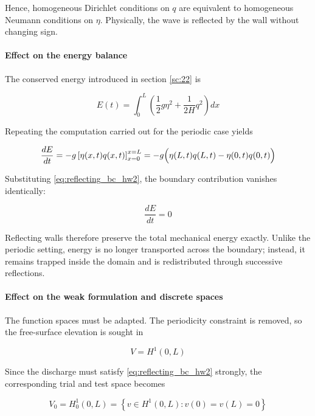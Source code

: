 Hence, homogeneous Dirichlet conditions on \(q\) are equivalent to homogeneous Neumann conditions on \(\eta\). Physically, the wave is reflected by the wall without changing sign.

\paragraph{Effect on the energy balance}
The conserved energy introduced in section \ref{sc:22} is

\begin{equation}
E(t) = \int_0^L \left(\frac{1}{2}g\eta^2 + \frac{1}{2H}q^2\right) dx
\label{eq:energy_rw}
\end{equation}

Repeating the computation carried out for the periodic case yields

\begin{equation}
\frac{dE}{dt}
= -g\left[\eta(x,t) q(x,t)\right]_{x=0}^{x=L}
= -g\Bigl(\eta(L,t)q(L,t)-\eta(0,t)q(0,t)\Bigr)
\label{eq:energy_wall_boundary_term}
\end{equation}

Substituting \eqref{eq:reflecting_bc_hw2}, the boundary contribution vanishes identically:

\begin{equation}
\frac{dE}{dt}=0
\label{eq:energy_reflecting_conserved}
\end{equation}

Reflecting walls therefore preserve the total mechanical energy exactly. Unlike the periodic setting, energy is no longer transported across the boundary; instead, it remains trapped inside the domain and is redistributed through successive reflections.

\paragraph{Effect on the weak formulation and discrete spaces}
The function spaces must be adapted. The periodicity constraint is removed, so the free-surface elevation is sought in

\begin{equation}
V = H^1(0,L)
\label{eq:wall_space_eta}
\end{equation}

Since the discharge must satisfy \eqref{eq:reflecting_bc_hw2} strongly, the corresponding trial and test space becomes

\begin{equation}
V_0 = H_0^1(0,L) = \left\{v\in H^1(0,L): v(0)=v(L)=0\right\}
\label{eq:wall_space_q}
\end{equation}

